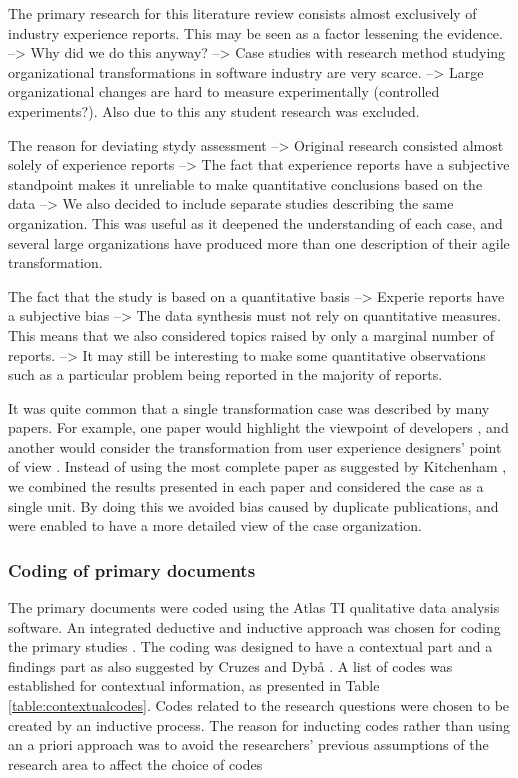 \documentclass[preprint,authoryear,12pt]{elsarticle}
\begin{document}
The primary research for this literature review consists almost exclusively of
industry experience reports. This may be seen as a factor lessening the
evidence.
--> Why did we do this anyway?
--> Case studies with research method studying organizational transformations in
    software industry are very scarce.
--> Large organizational changes are hard to measure experimentally (controlled
    experiments?). Also due to this any student research was excluded.

The reason for deviating stydy assessment
--> Original research consisted almost solely of experience reports
--> The fact that experience reports have a subjective standpoint makes it
    unreliable to make quantitative conclusions based on the data
--> We also decided to include separate studies describing the same organization.
    This was useful as it deepened the understanding of each case, and several
    large organizations have produced more than one description of their agile
    transformation.

The fact that the study is based on a quantitative basis
--> Experie reports have a subjective bias
--> The data synthesis must not rely on quantitative measures. This means that
    we also considered topics raised by only a marginal number of reports.
--> It may still be interesting to make some quantitative observations such as
    a particular problem being reported in the majority of reports.

It was quite common that a single transformation case was described by many
papers. For example, one paper would highlight the viewpoint of developers
\cite{Fry2007}, and another would consider the transformation from user
experience designers' point of view \cite{Federoff2009}. Instead of using the
most complete paper as suggested by Kitchenham \cite{Kitchenham2007}, we
combined the results presented in each paper and considered the case as a single
unit. By doing this we avoided bias caused by duplicate publications, and were
enabled to have a more detailed view of the case organization.


\subsubsection{Coding of primary documents}

The primary documents were coded using the Atlas TI qualitative data analysis software.
An integrated deductive and inductive approach was chosen for coding the primary
studies \cite{Cruzes2011a}. The coding was designed to have a contextual part
and a findings part as also suggested by Cruzes and Dybå \cite{Cruzes2011a}. A
list of codes was established for contextual information, as presented in Table
\ref{table:contextualcodes}. Codes related to the research questions were chosen
to be created by an inductive process. The reason for inducting codes rather
than using an a priori approach was to avoid the researchers' previous
assumptions of the research area to affect the choice of codes
\end{document}
